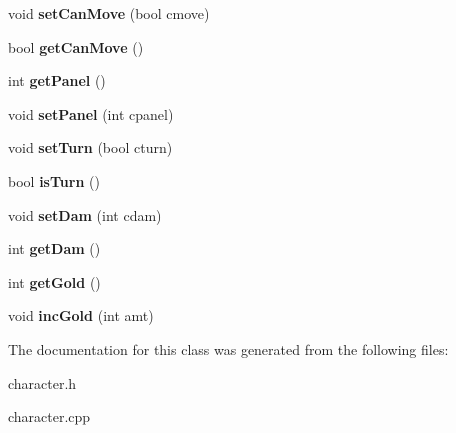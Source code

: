 \begin{DoxyCompactItemize}
\item 
\hypertarget{class_character_ae2ae019ff6d7b8150113fd8add961f39}{void {\bfseries set\-Can\-Move} (bool cmove)}\label{class_character_ae2ae019ff6d7b8150113fd8add961f39}

\item 
\hypertarget{class_character_a5d2616851987d4f844b2c440636f6b7f}{bool {\bfseries get\-Can\-Move} ()}\label{class_character_a5d2616851987d4f844b2c440636f6b7f}

\item 
\hypertarget{class_character_a104dd581ebc631f1b9448abf47d6cb46}{int {\bfseries get\-Panel} ()}\label{class_character_a104dd581ebc631f1b9448abf47d6cb46}

\item 
\hypertarget{class_character_aa3c91db87d4e4ccee3a5bdc9546084de}{void {\bfseries set\-Panel} (int cpanel)}\label{class_character_aa3c91db87d4e4ccee3a5bdc9546084de}

\item 
\hypertarget{class_character_a8173beca9b6a1aee4213156f44f73708}{void {\bfseries set\-Turn} (bool cturn)}\label{class_character_a8173beca9b6a1aee4213156f44f73708}

\item 
\hypertarget{class_character_afad175e9eb494ea86fb3f3f03becbf86}{bool {\bfseries is\-Turn} ()}\label{class_character_afad175e9eb494ea86fb3f3f03becbf86}

\item 
\hypertarget{class_character_ae5614f09a48cab021451e1d174c49f40}{void {\bfseries set\-Dam} (int cdam)}\label{class_character_ae5614f09a48cab021451e1d174c49f40}

\item 
\hypertarget{class_character_a22e0b2d268c078a0a2055bc547c13779}{int {\bfseries get\-Dam} ()}\label{class_character_a22e0b2d268c078a0a2055bc547c13779}

\item 
\hypertarget{class_character_af20f9fcc4dc0439c3d33463d52f62baa}{int {\bfseries get\-Gold} ()}\label{class_character_af20f9fcc4dc0439c3d33463d52f62baa}

\item 
\hypertarget{class_character_a022b611a56f1c4a87972de352b9c58ed}{void {\bfseries inc\-Gold} (int amt)}\label{class_character_a022b611a56f1c4a87972de352b9c58ed}

\end{DoxyCompactItemize}


The documentation for this class was generated from the following files\-:\begin{DoxyCompactItemize}
\item 
character.\-h\item 
character.\-cpp\end{DoxyCompactItemize}
